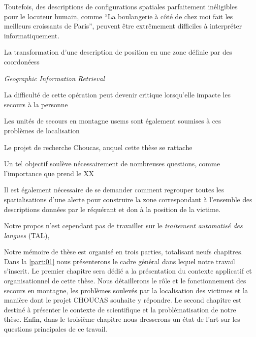 

Toutefois, des descriptions de configurations spatiales parfaitement
inéligibles pour le locuteur humain, comme \enquote{La boulangerie à
  côté de chez moi fait les meilleurs croissants de Paris}, peuvent
être extrêmement difficiles à interpréter informatiquement.

La transformation d'une description de position en une zone définie
par des coordonéess

\emph{Geographic Information Retrieval} \autocite{Jones2008}



La difficulté de cette opération peut devenir critique lorsqu'elle
impacte les secours à la personne \autocite{DosSantosFerreria2019} 

Les unités de secours en montagne \acp{usem} sont également soumises
à ces problèmes de localisation

Le projet de recherche Choucas, auquel cette thèse se rattache

Un tel objectif soulève nécessairement de nombreuses questions, comme
l'importance que prend le XX



Il est également nécessaire de se demander comment regrouper toutes
les spatialisations d'une alerte pour construire la zone correspondant
à l'ensemble des descriptions données par le réquérant et don à la
position de la victime.





Notre propos n'est cependant pas de travailler sur le \emph{traitement
  automatisé des langues} (TAL), 



Notre mémoire de thèse est organisé en trois parties, totalisant neufs
chapitres. Dans la \autoref{part:01} nous présenterons le cadre
général dans lequel notre travail s'inscrit. Le premier chapitre sera
dédié a la présentation du contexte applicatif et organisationnel de
cette thèse. Nous détaillerons le rôle et le fonctionnement des
secours en montagne, les problèmes soulevés par la localisation des
victimes et la manière dont le projet CHOUCAS souhaite y répondre. Le
second chapitre est destiné à présenter le contexte de scientifique et
la problématisation de notre thèse. Enfin, dans le troisième chapitre
nous dresserons un état de l'art sur les questions principales de ce
travail.

